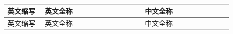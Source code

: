 \begin{abbreviation}
\begin{longtable}{>{\centering\arraybackslash}m{0.15\linewidth}>{\centering\arraybackslash}m{0.4\linewidth}>{\centering\arraybackslash}m{0.35\linewidth}}

    \toprule[1pt]
  \sffamily\fontsize{14pt}{25.67pt} {英文缩写} &\sffamily\fontsize{14pt}{25.67pt}  {英文全称} &\sffamily\fontsize{14pt}{25.67pt} {中文全称}\\
    \midrule[1pt]
    \endfirsthead %
    \toprule[1pt]
  \sffamily\fontsize{14pt}{25.67pt} {英文缩写} &\sffamily\fontsize{14pt}{25.67pt}  {英文全称} &\sffamily\fontsize{14pt}{25.67pt} {中文全称}\\
    \midrule[1pt]
    \endhead %


\end{longtable}
\end{abbreviation}
